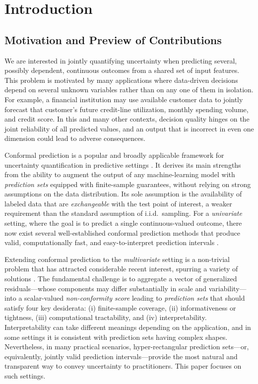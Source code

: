 \section{Introduction}
\label{sec:intro}

\subsection{Motivation and Preview of Contributions}
\label{sec:intro-motivation} 

We are interested in jointly quantifying uncertainty when predicting several, possibly dependent, continuous outcomes from a shared set of input features.
This problem is motivated by many applications where data-driven decisions depend on several unknown variables rather than on any one of them in isolation. For example, a financial institution may use available customer data to jointly forecast that customer's future credit-line utilization, monthly spending volume, and credit score. In this and many other contexts, decision quality hinges on the joint reliability of all predicted values, and an output that is incorrect in even one dimension could lead to adverse consequences.

Conformal prediction is a popular and broadly applicable framework for uncertainty quantification in predictive settings \citep{vovk2005algorithmic, angelopoulos2023conformal}. It derives its main strengths from the ability to augment the output of any machine-learning model with {\em prediction sets} equipped with finite-sample guarantees, without relying on strong assumptions on the data distribution. Its sole assumption is the availability of labeled data that are {\em exchangeable} with the test point of interest, a weaker requirement than the standard assumption of i.i.d.~sampling. For a {\em univariate} setting, where the goal is to predict a single continuous-valued outcome, there now exist several well-established conformal prediction methods that produce valid, computationally fast, and easy-to-interpret prediction intervals \citep{lei2018distribution, romano2019conformalized, sesia2021conformal}.

Extending conformal prediction to the {\em multivariate} setting is a non-trivial problem that has attracted considerable recent interest, spurring a variety of solutions \citep{dheur2025unified}. The fundamental challenge is to aggregate a vector of generalized residuals—whose components may differ substantially in scale and variability—into a scalar-valued {\em non-conformity score} leading to {\em prediction sets} that should satisfy four key desiderata: (i) finite-sample coverage, (ii) informativeness or tightness, (iii) computational tractability, and (iv) interpretability.
Interpretability can take different meanings depending on the application, and in some settings it is consistent with prediction sets having complex shapes. Nevertheless, in many practical scenarios, hyper-rectangular prediction sets—or, equivalently, jointly valid prediction intervals—provide the most natural and transparent way to convey uncertainty to practitioners. This paper focuses on such settings.

